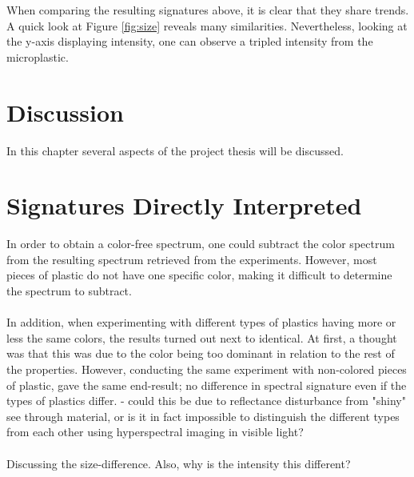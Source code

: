 \noindent
When comparing the resulting signatures above, it is clear that they share trends. A quick look at Figure \ref{fig:size} reveals many similarities. Nevertheless, looking at the y-axis displaying intensity, one can observe a tripled intensity from the microplastic. 





\section{Discussion}
\label{sec:discussion}
 In this chapter several aspects of the project thesis will be discussed.
 
 

 
 
 
\section{Signatures Directly Interpreted}
In order to obtain a color-free spectrum, one could subtract the color spectrum from the resulting spectrum retrieved from the experiments. However, most pieces of plastic do not have one specific color, making it difficult to determine the spectrum to subtract. 
\\\\
In addition, when experimenting with different types of plastics having more or less the same colors, the results turned out next to identical. At first, a thought was that this was due to the color being too dominant in relation to the rest of the properties. However, conducting the same experiment with non-colored pieces of plastic, gave the same end-result; no difference in spectral signature even if the types of plastics differ. - could this be due to reflectance disturbance from "shiny" see through material, or is it in fact impossible to distinguish the different types from each other using hyperspectral imaging in visible light?
\\\\
Discussing the size-difference. Also, why is the intensity this different?
 
